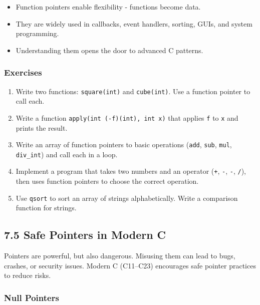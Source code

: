 \documentclass[
  letterpaper,
  DIV=11,
  numbers=noendperiod]{scrreprt}
\providecommand{\tightlist}{%
  \setlength{\itemsep}{0pt}\setlength{\parskip}{0pt}}
\begin{document}
\begin{itemize}
\tightlist
\item
  Function pointers enable flexibility - functions become data.
\item
  They are widely used in callbacks, event handlers, sorting, GUIs, and
  system programming.
\item
  Understanding them opens the door to advanced C patterns.
\end{itemize}

\subsubsection{Exercises}\label{exercises-33}

\begin{enumerate}
\def\labelenumi{\arabic{enumi}.}
\tightlist
\item
  Write two functions: \texttt{square(int)} and \texttt{cube(int)}. Use
  a function pointer to call each.
\item
  Write a function \texttt{apply(int\ (-f)(int),\ int\ x)} that applies
  \texttt{f} to \texttt{x} and prints the result.
\item
  Write an array of function pointers to basic operations (\texttt{add},
  \texttt{sub}, \texttt{mul}, \texttt{div\_int}) and call each in a
  loop.
\item
  Implement a program that takes two numbers and an operator
  (\texttt{+}, \texttt{-}, \texttt{-}, \texttt{/}), then uses function
  pointers to choose the correct operation.
\item
  Use \texttt{qsort} to sort an array of strings alphabetically. Write a
  comparison function for strings.
\end{enumerate}

\subsection{7.5 Safe Pointers in Modern
C}\label{safe-pointers-in-modern-c}

Pointers are powerful, but also dangerous. Misusing them can lead to
bugs, crashes, or security issues. Modern C (C11--C23) encourages safe
pointer practices to reduce risks.

\subsubsection{Null Pointers}\label{null-pointers}
\end{document}
